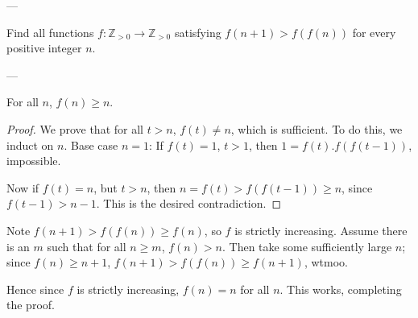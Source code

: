 
---

Find all functions $f:\mathbb Z_{>0}\to\mathbb Z_{>0}$ satisfying $f(n+1)>f(f(n))$ for every positive integer $n$.

---

\begin{iclaim*}
    For all $n$, $f(n)\ge n$.
\end{iclaim*}
\begin{proof}
    We prove that for all $t>n$, $f(t)\ne n$, which is sufficient. To do this, we induct on $n$. Base case $n=1$: If $f(t)=1$, $t>1$, then $1=f(t).f(f(t-1))$, impossible.

    Now if $f(t)=n$, but $t>n$, then $n=f(t)>f(f(t-1))\ge n$, since $f(t-1)>n-1$. This is the desired contradiction.
\end{proof}

Note $f(n+1)>f(f(n))\ge f(n)$, so $f$ is strictly increasing. Assume there is an $m$ such that for all $n\ge m$, $f(n)>n$. Then take some sufficiently large $n$; since $f(n)\ge n+1$, $f(n+1)>f(f(n))\ge f(n+1)$, wtmoo.

Hence since $f$ is strictly increasing, $f(n)=n$ for all $n$. This works, completing the proof.

